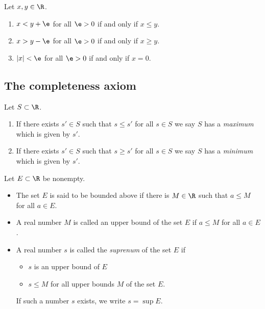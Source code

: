 \documentclass{article}
\begin{document}
\begin{theorem}
    Let $x,y\in\R$.
    \begin{enumerate}
        \item $x<y+\e$ for all $\e>0$ if and only if $x\leq y$.
        \item $x>y-\e$ for all $\e>0$ if and only if $x\geq y$.
        \item $|x|<\e$ for all $\e>0$ if and only if $x=0$.
    \end{enumerate}
\end{theorem}

\subsection{The completeness axiom}

\begin{definition}
    Let $S\subset\R$.
    \begin{enumerate}
        \item If there exists $s'\in S$ such that $s\leq s'$ for all $s\in S$ we say $S$ has a
              \emph{maximum} which is given by $s'$.
        \item If there exists $s'\in S$ such that $s\geq s'$ for all $s\in S$ we say $S$ has a
              \emph{minimum} which is given by $s'$.
    \end{enumerate}
\end{definition}

\begin{definition}
    Let $E\subset\R$ be nonempty.
    \begin{itemize}
        \item The set $E$ is said to be bounded above if there is $M\in\R$ such that $a\leq M$ for all $a\in E$.
        \item A real number $M$ is called an upper bound of the set $E$ if $a\leq M$ for all $a\in E$.
        \item A real number $s$ is called the \emph{suprenum} of the set $E$ if \begin{itemize}
            \item $s$ is an upper bound of $E$
            \item $s\leq M$ for all upper bounds $M$ of the set $E$.
        \end{itemize}
        If such a number $s$ exists, we write $s=\sup E$.
    \end{itemize}
\end{definition}
\end{document}
